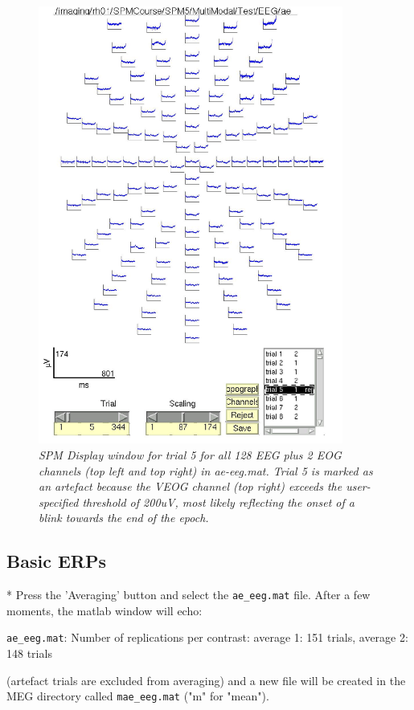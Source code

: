 \begin{figure}
\begin{center}
\includegraphics[width=100mm]{multimodal/figures/figure_32_2}
\caption{\em  SPM Display window for trial 5 for all 128 EEG plus 2 EOG channels (top left and top right) in ae-eeg.mat. Trial 5 is marked as an artefact because the VEOG channel (top right) exceeds the user-specified threshold of 200uV, most likely reflecting the onset of a blink towards the end of the epoch. \label{fig_32_2}}
\end{center}
\end{figure}



\subsection{Basic ERPs}

* Press the 'Averaging' button and select the \verb!ae_eeg.mat! file. After a few moments, the matlab window will echo:

	\verb!ae_eeg.mat!: Number of replications per contrast:
	average 1: 151 trials, average 2: 148 trials

	(artefact trials are excluded from averaging) and a new file will be created in 	the MEG directory called \verb!mae_eeg.mat! ("m" for "mean").

